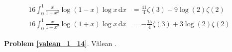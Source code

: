 %

\begin{problem_with_solution}
    \label{valean_1_14}%
    \begin{align}
        16 \int_0^1 \frac{x}{1+ x^2} \log (1 - x) \log x \,\mathrm{d}x & = \frac{41}{4} \zeta(3) - 9 \log(2) \zeta(2) \\
        16 \int_0^1 \frac{x}{1+ x^2} \log (1 + x) \log x \,\mathrm{d}x & = -\frac{15}{4} \zeta(3) + 3 \log(2) \zeta(2)
    \end{align} 
\end{problem_with_solution}



\textbf{Problem \ref{valean_1_14}}.
Vălean \cite[s. 8, 9]{nahin15}.


%